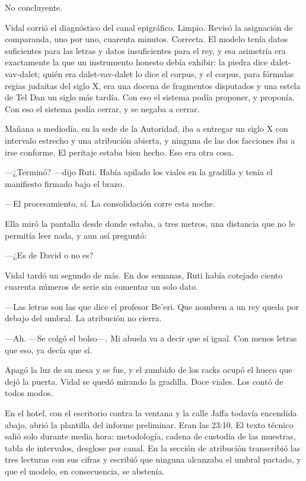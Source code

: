 No concluyente.

Vidal corrió el diagnóstico del canal epigráfico. Limpio. Revisó la asignación de comparanda, uno por uno, cuarenta minutos. Correcta. El modelo tenía datos suficientes para las letras y datos insuficientes para el rey, y esa asimetría era exactamente la que un instrumento honesto debía exhibir: la piedra dice dalet-vav-dalet; quién era dalet-vav-dalet lo dice el corpus, y el corpus, para fórmulas regias judaítas del siglo X, era una docena de fragmentos disputados y una estela de Tel Dan un siglo más tardía. Con eso el sistema podía proponer, y proponía. Con eso el sistema podía cerrar, y se negaba a cerrar.

Mañana a mediodía, en la sede de la Autoridad, iba a entregar un siglo X con intervalo estrecho y una atribución abierta, y ninguna de las dos facciones iba a irse conforme. El peritaje estaba bien hecho. Eso era otra cosa.

---¿Terminó? ---dijo Ruti. Había apilado los viales en la gradilla y tenía el manifiesto firmado bajo el brazo.

---El procesamiento, sí. La consolidación corre esta noche.

Ella miró la pantalla desde donde estaba, a tres metros, una distancia que no le permitía leer nada, y aun así preguntó:

---¿Es de David o no es?

Vidal tardó un segundo de más. En dos semanas, Ruti había cotejado ciento cuarenta números de serie sin comentar un solo dato.

---Las letras son las que dice el profesor Be'eri. Que nombren a un rey queda por debajo del umbral. La atribución no cierra.

---Ah. ---Se colgó el bolso---. Mi abuela va a decir que sí igual. Con menos letras que eso, ya decía que sí.

Apagó la luz de su mesa y se fue, y el zumbido de los racks ocupó el hueco que dejó la puerta. Vidal se quedó mirando la gradilla. Doce viales. Los contó de todos modos.


\scenebreak


En el hotel, con el escritorio contra la ventana y la calle Jaffa todavía encendida abajo, abrió la plantilla del informe preliminar. Eran las 23:10. El texto técnico salió solo durante media hora: metodología, cadena de custodia de las muestras, tabla de intervalos, desglose por canal. En la sección de atribución transcribió las tres lecturas con sus cifras y escribió que ninguna alcanzaba el umbral pactado, y que el modelo, en consecuencia, se abstenía.

